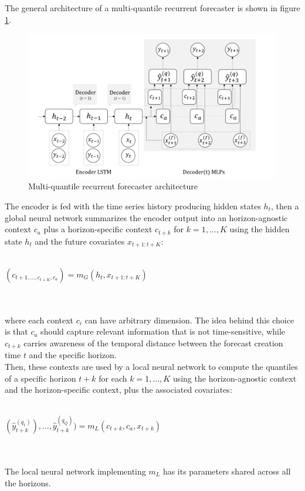 \documentclass[a4paper, 12pt]{article} %
\begin{document}
	The general architecture of a multi-quantile recurrent forecaster is shown in figure \ref{fig:mqforecaster}. 
	\begin{figure}
		\includegraphics[width=\linewidth]{img/mqcnn.png}
		\caption{Multi-quantile recurrent forecaster architecture}
		\label{fig:mqforecaster}
	\end{figure}
	The encoder is fed with the time series history producing hidden states $h_t$,  then a global neural network summarizes the encoder output into an horizon-agnostic context $c_a$ plus a horizon-specific context $c_{t+k}$ for $k=1,...,K$ using the hidden state $h_t$ and the future covariates $x_{t+1:t+K}$:\\\\
	\centerline{
	$
	(c_{t+1, ..., c_{t+K}, c_a}) = m_G(h_t, x_{t+1:t+K})
	$
	}\\\\
	where each context $c_i$ can have arbitrary dimension. The idea behind this choice is that $c_a$ should capture relevant information that is not time-sensitive, while $c_{t+k}$ carries awareness of the temporal distance between the forecast creation time $t$ and the specific horizon.\\ 
	Then, these contexts are used by a local neural network to compute the quantiles of a specific horizon $t+k$ for each $k=1,...,K$ using the horizon-agnostic context and the horizon-specific context, plus the associated covariates:\\\\
	\centerline{
	$
	(\hat{y}_{t+k}^{(q_1)}), ..., \hat{y}_{t+k}^{(q_Q)}) = m_L(c_{t+k}, c_a, x_{t+k})
	$
	}\\\\
	The local neural network implementing $m_L$ has its parameters shared across all the horizons.
	
\end{document}
